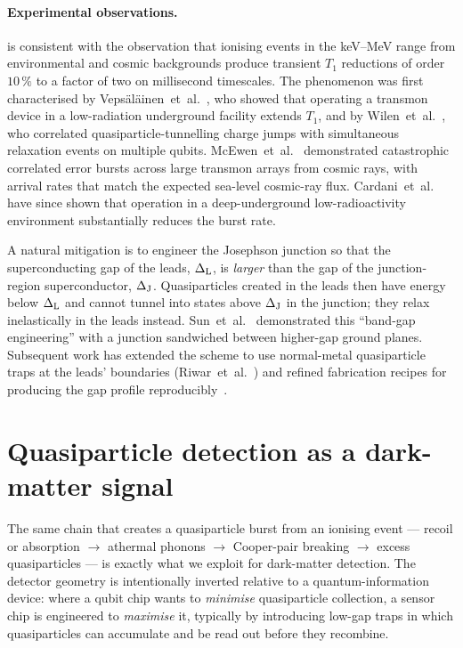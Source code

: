 \paragraph{Experimental observations.}
 is consistent with the observation that
ionising events in the keV--MeV range from environmental and
cosmic backgrounds produce transient $T_1$ reductions of order
$10\,\%$ to a factor of two on millisecond timescales. The
phenomenon was first characterised by
Vepsäläinen~et~al.~\cite{vepsalainen2020}, who showed that
operating a transmon device in a low-radiation underground
facility extends $T_1$, and by
Wilen~et~al.~\cite{wilen2021}, who correlated
quasiparticle-tunnelling charge jumps with simultaneous
relaxation events on multiple qubits.
McEwen~et~al.~\cite{mcewen2022} demonstrated catastrophic
correlated error bursts across large transmon arrays from cosmic
rays, with arrival rates that match the expected sea-level
cosmic-ray flux. Cardani~et~al.~\cite{cardani2021} have since
shown that operation in a deep-underground low-radioactivity
environment substantially reduces the burst rate.

\begin{remark}
\label{rem:gap-engineering}
A natural mitigation is to engineer the Josephson junction so
that the superconducting gap of the leads, $\Delta_{\rm L}$, is
\emph{larger} than the gap of the junction-region superconductor,
$\Delta_{\rm J}$. Quasiparticles created in the leads then have
energy below $\Delta_{\rm L}$ and cannot tunnel into states above
$\Delta_{\rm J}$ in the junction; they relax inelastically in the
leads instead. Sun~et~al.~\cite{sun2012} demonstrated this
``band-gap engineering'' with a junction sandwiched between
higher-gap ground planes. Subsequent work has extended the scheme
to use normal-metal quasiparticle traps at the leads' boundaries
(Riwar~et~al.~\cite{riwar2016}) and refined fabrication recipes
for producing the gap profile reproducibly~\cite{pan2022}.
\end{remark}

\section{Quasiparticle detection as a dark-matter signal}
\label{sec:qp-dm}

\begin{phenomenon}
The same chain that creates a quasiparticle burst from an ionising
event --- recoil or absorption $\to$ athermal phonons $\to$
Cooper-pair breaking $\to$ excess quasiparticles --- is exactly
what we exploit for dark-matter detection. The detector geometry
is intentionally inverted relative to a quantum-information
device: where a qubit chip wants to \emph{minimise} quasiparticle
collection, a sensor chip is engineered to \emph{maximise} it,
typically by introducing low-gap traps in which quasiparticles
can accumulate and be read out before they recombine.
\end{phenomenon}

